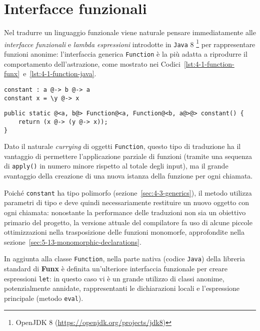 \section{Interfacce funzionali}
\label{sec:4-1-functional-interfaces}

Nel tradurre un linguaggio funzionale viene naturale pensare immediatamente alle \textit{interfacce funzionali} e \textit{lambda espressioni}
introdotte in \texttt{Java} 8%
\footnote{OpenJDK 8 (\url{https://openjdk.org/projects/jdk8})}
per rappresentare funzioni anonime: l'interfaccia generica \texttt{Function} è la più adatta a riprodurre
il comportamento dell'astrazione, come mostrato nei Codici~\ref{lst:4-1-function-funx}~e~\ref{lst:4-1-function-java}.

\vspace{4mm}
\begin{lstlisting}[caption={Semplice funzione in \textbf{Funx}}, style=funxCode, label={lst:4-1-function-funx}]
constant : a @-> b @-> a
constant x = \y @-> x
\end{lstlisting}
\vspace{4mm}
\begin{lstlisting}[caption={Corrispondente metodo in \texttt{Java}}, style=javaCode, label={lst:4-1-function-java}]
public static @<a, b@> Function@<a, Function@<b, a@>@> constant() {
    return (x @-> (y @-> x));
}
\end{lstlisting}
\vspace{4mm}

\noindent Dato il naturale \textit{currying} di oggetti \texttt{Function}, questo tipo di traduzione ha il vantaggio
di permettere l'applicazione parziale di funzioni (tramite una sequenza di \texttt{apply()} in numero minore rispetto al totale degli input),
ma il grande svantaggio della creazione di una nuova istanza della funzione per ogni chiamata.


Poiché \texttt{constant} ha tipo polimorfo (sezione~\ref{sec:4-3-generics}), il metodo utilizza parametri di tipo
e deve quindi necessariamente restituire un nuovo oggetto con ogni chiamata:
nonostante la performance delle traduzioni non sia un obiettivo primario del progetto, la versione attuale
del compilatore fa uso di alcune piccole ottimizzazioni nella trasposizione delle funzioni monomorfe,
approfondite nella sezione~\ref{sec:5-13-monomorphic-declarations}.

\newpage

\noindent In aggiunta alla classe \texttt{Function}, nella parte nativa (codice \texttt{Java}) della libreria standard
di \textbf{Funx} è definita un'ulteriore interfaccia funzionale per creare espressioni \texttt{let}:
in questo caso vi è un grande utilizzo di classi anonime, potenzialmente annidate,
rappresentanti le dichiarazioni locali e l'espressione principale (metodo \texttt{eval}).

